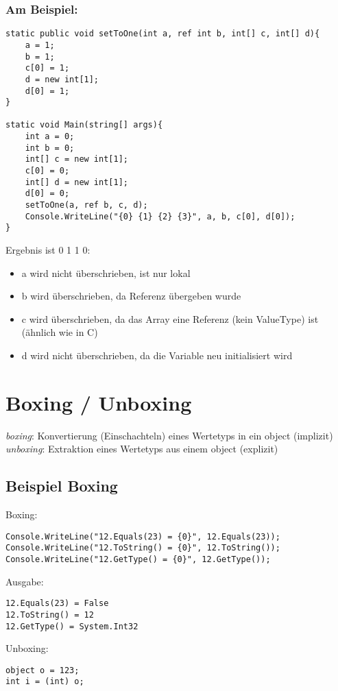 \subsubsection*{Am Beispiel:}
\begin{lstlisting}[language={[Sharp]C}]
static public void setToOne(int a, ref int b, int[] c, int[] d){
	a = 1;
	b = 1;
	c[0] = 1;
	d = new int[1];
	d[0] = 1;
}

static void Main(string[] args){
	int a = 0;
	int b = 0;
	int[] c = new int[1];
	c[0] = 0;
	int[] d = new int[1];
	d[0] = 0;
	setToOne(a, ref b, c, d);
	Console.WriteLine("{0} {1} {2} {3}", a, b, c[0], d[0]);
}
\end{lstlisting}
Ergebnis ist 0 1 1 0:
\begin{itemize}
\item a wird nicht überschrieben, ist nur lokal
\item b wird überschrieben, da Referenz übergeben wurde
\item c wird überschrieben, da das Array eine Referenz (kein ValueType) ist (ähnlich wie in C)
\item d wird nicht überschrieben, da die Variable neu initialisiert wird
\end{itemize}

\section{Boxing / Unboxing}

\emph{boxing}: Konvertierung (Einschachteln) eines Wertetyps in ein object (implizit)\\
\emph{unboxing}: Extraktion eines Wertetyps aus einem object (explizit)

\subsection*{Beispiel Boxing}

Boxing:
\begin{lstlisting}[language={[Sharp]C}]
Console.WriteLine("12.Equals(23) = {0}", 12.Equals(23));
Console.WriteLine("12.ToString() = {0}", 12.ToString());
Console.WriteLine("12.GetType() = {0}", 12.GetType());
\end{lstlisting}
Ausgabe:
\begin{lstlisting}[language={[Sharp]C}]
12.Equals(23) = False
12.ToString() = 12
12.GetType() = System.Int32
\end{lstlisting}
Unboxing:
\begin{lstlisting}[language={[Sharp]C}]
object o = 123;
int i = (int) o;
\end{lstlisting}

